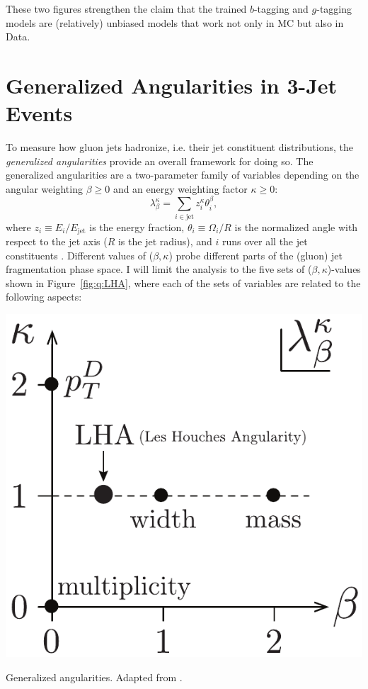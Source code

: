 These two figures strengthen the claim that the trained $b$-tagging and $g$-tagging models are (relatively) unbiased models that work not only in MC but also in Data.

\section{Generalized Angularities in 3-Jet Events}
\label{sec:q:generalized_angularities_3j}

To measure how gluon jets hadronize, i.e. their jet constituent distributions, the \emph{generalized angularities} provide an overall framework for doing so. The generalized angularities are a two-parameter family of variables depending on the angular weighting $\beta \geq 0$ and an energy weighting factor $\kappa \geq 0$:
\begin{equation}
  \lambda_\beta^\kappa = \sum_{i \in \mathrm{jet}} z_i^\kappa \theta_i^\beta,
\end{equation}
where $z_i \equiv E_i / E_\mathrm{jet}$ is the energy fraction, $\theta_i \equiv \Omega_i / R$ is the normalized angle with respect to the jet axis ($R$ is the jet radius), and $i$ runs over all the jet constituents \citep{grasSystematicsQuarkGluon2017,larkoskiGainingMutualInformation2014}. Different values of ($\beta, \kappa$) probe different parts of the (gluon) jet fragmentation phase space. I will limit the analysis to the five sets of ($\beta, \kappa$)-values shown in Figure~\ref{fig:q:LHA}, where each of the sets of variables are related to the following aspects:

\begin{marginfigure}[5.5cm]
  \centerfloat
  \includegraphics[width=\textwidth]{figures/LHA/LHA.pdf}
  \caption[Generalized Angularities]
          {Generalized angularities. Adapted from \citet{larkoskiGainingMutualInformation2014}. } 
  \label{fig:q:LHA}
\end{marginfigure}

